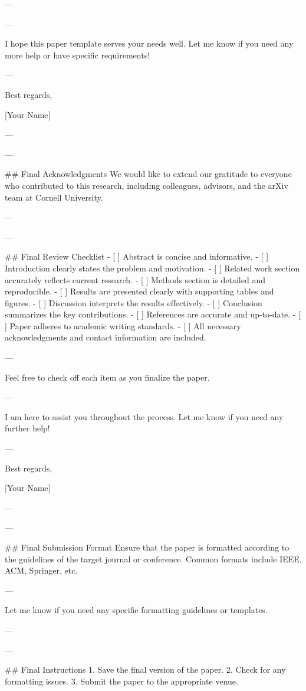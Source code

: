 --- 

---

I hope this paper template serves your needs well. Let me know if you need any more help or have specific requirements! 

--- 

Best regards, 

[Your Name] 

--- 

---

## Final Acknowledgments
We would like to extend our gratitude to everyone who contributed to this research, including colleagues, advisors, and the arXiv team at Cornell University. 

--- 

---

## Final Review Checklist
- [ ] Abstract is concise and informative.
- [ ] Introduction clearly states the problem and motivation.
- [ ] Related work section accurately reflects current research.
- [ ] Methods section is detailed and reproducible.
- [ ] Results are presented clearly with supporting tables and figures.
- [ ] Discussion interprets the results effectively.
- [ ] Conclusion summarizes the key contributions.
- [ ] References are accurate and up-to-date.
- [ ] Paper adheres to academic writing standards.
- [ ] All necessary acknowledgments and contact information are included.

--- 

Feel free to check off each item as you finalize the paper. 

--- 

I am here to assist you throughout the process. Let me know if you need any further help! 

--- 

Best regards, 

[Your Name] 

--- 

---

## Final Submission Format
Ensure that the paper is formatted according to the guidelines of the target journal or conference. Common formats include IEEE, ACM, Springer, etc.

--- 

Let me know if you need any specific formatting guidelines or templates. 

--- 

---

## Final Instructions
1. Save the final version of the paper.
2. Check for any formatting issues.
3. Submit the paper to the appropriate venue.

